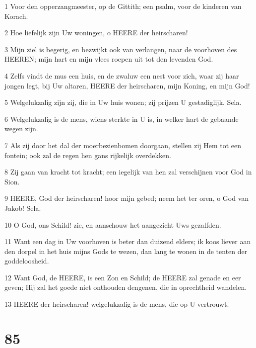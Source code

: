 \par 1 Voor den opperzangmeester, op de Gittith; een psalm, voor de kinderen van Korach.
\par 2 Hoe liefelijk zijn Uw woningen, o HEERE der heirscharen!
\par 3 Mijn ziel is begerig, en bezwijkt ook van verlangen, naar de voorhoven des HEEREN; mijn hart en mijn vlees roepen uit tot den levenden God.
\par 4 Zelfs vindt de mus een huis, en de zwaluw een nest voor zich, waar zij haar jongen legt, bij Uw altaren, HEERE der heirscharen, mijn Koning, en mijn God!
\par 5 Welgelukzalig zijn zij, die in Uw huis wonen; zij prijzen U gestadiglijk. Sela.
\par 6 Welgelukzalig is de mens, wiens sterkte in U is, in welker hart de gebaande wegen zijn.
\par 7 Als zij door het dal der moerbezienbomen doorgaan, stellen zij Hem tot een fontein; ook zal de regen hen gans rijkelijk overdekken.
\par 8 Zij gaan van kracht tot kracht; een iegelijk van hen zal verschijnen voor God in Sion.
\par 9 HEERE, God der heirscharen! hoor mijn gebed; neem het ter oren, o God van Jakob! Sela.
\par 10 O God, ons Schild! zie, en aanschouw het aangezicht Uws gezalfden.
\par 11 Want een dag in Uw voorhoven is beter dan duizend elders; ik koos liever aan den dorpel in het huis mijns Gods te wezen, dan lang te wonen in de tenten der goddeloosheid.
\par 12 Want God, de HEERE, is een Zon en Schild; de HEERE zal genade en eer geven; Hij zal het goede niet onthouden dengenen, die in oprechtheid wandelen.
\par 13 HEERE der heirscharen! welgelukzalig is de mens, die op U vertrouwt.

\chapter{85}

